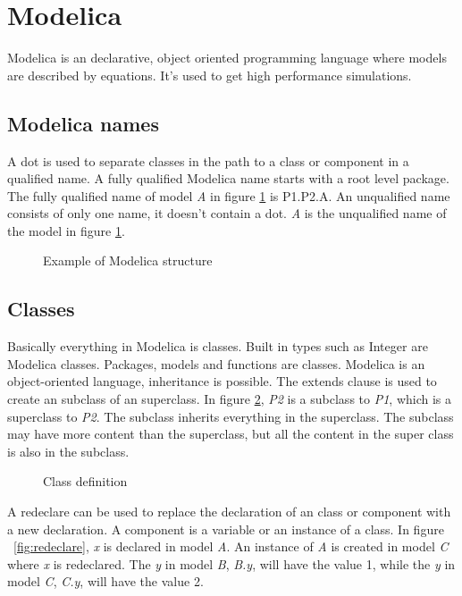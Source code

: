 \documentclass{cslthse-msc}
\begin{document}
\section{Modelica}

Modelica is an declarative, object oriented programming language where models are described by equations. It's used to get high performance simulations.

\subsection{Modelica names}
A dot is used to separate classes in the path to a class or component in a qualified name. A fully qualified Modelica name starts with a root level package. The fully qualified name of model \textit{A} in figure \ref{fig:modelicaExample} is P1.P2.A. An unqualified name consists of only one name, it doesn't contain a dot. \textit{A} is the unqualified name of the model in figure \ref{fig:modelicaExample}.
\begin{figure}[!htbp]
    \centering
    \qquad
    \subfloat{\raisebox{3.2 cm}{}}
    \caption{Example of Modelica structure}
    \label{fig:modelicaExample}
\end{figure}

\subsection{Classes}
Basically everything in Modelica is classes. Built in types such as Integer are Modelica classes. Packages, models and functions are classes. Modelica is an object-oriented language, inheritance is possible. The extends clause is used to create an subclass of an superclass. In figure \ref{fig:classDefinition}, \textit{P2} is a subclass to \textit{P1}, which is a superclass to \textit{P2}. The subclass inherits everything in the superclass. The subclass may have more content than the superclass, but all the content in the super class is also in the subclass. 

\begin{figure}[H]
    \centering
    \subfloat{{}}
    \caption{Class definition}
    \label{fig:classDefinition}
\end{figure}

A redeclare can be used to replace the declaration of an class or component with a new declaration. A component is a variable or an instance of a class. In figure ~\ref{fig:redeclare}, \textit{x} is declared in model \textit{A}. An instance of \textit{A} is created in model \textit{C} where \textit{x} is redeclared. The \textit{y} in model \textit{B}, \textit{B.y}, will have the value 1, while the \textit{y} in model \textit{C}, \textit{C.y}, will have the value 2.
\end{document}
